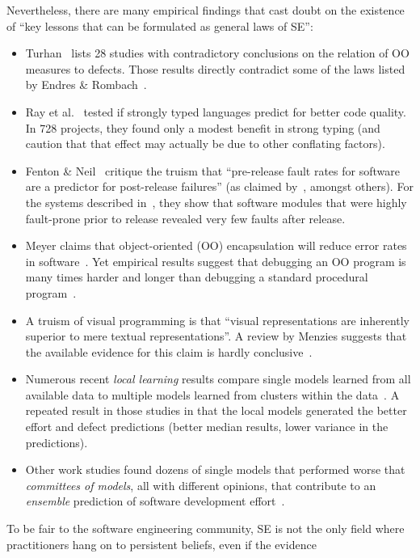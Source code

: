 \documentclass{sig-alternate}
\newcommand{\bi}{\begin{itemize}[leftmargin=0.4cm]}
\newcommand{\ei}{\end{itemize}}
\begin{document}
Nevertheless, there are many empirical  findings that 
cast doubt on the existence of  ``key lessons  that can be formulated
as general laws of SE'':
\bi
\item
Turhan~\cite{me12d} lists 28 studies with contradictory conclusions
on the relation of OO measures to defects.  Those results
 directly  contradict some of the laws listed by 
Endres \& Rombach~\cite{endres03}.

\item
Ray et al.~\cite{ray2014lang} tested if   strongly typed languages
predict for better code quality. In  728 projects,
they found  only a modest benefit in strong typing
(and caution that that effect may actually be due to other  conflating factors).
\item
Fenton \& Neil~\cite{fenton00,fenton00b}   critique the truism that
``pre-release fault rates for software
are a predictor for post-release failures'' (as claimed by~\cite{dunsmore88},
amongst others). For the systems described in~\cite{fenton97}, they
show that software modules that were highly fault-prone
prior to release revealed very few faults after release.
\item
Meyer claims that   object-oriented (OO) encapsulation will
reduce error rates in software~\cite{Meyer1988}.  Yet empirical results suggest
that debugging an OO program is many times harder and
longer than debugging a standard procedural program~\cite{hatton98}.
\item
A truism of visual programming is that ``visual
representations are inherently superior to mere textual representations''.
A review by Menzies suggests that the available
evidence for this claim is hardly conclusive~\cite{me00v}. 
\item Numerous recent {\em local learning} results compare single models
learned from all available data to multiple models learned from clusters within the data~\cite{betten14,yang11,yang13,minku13,me12d,me11m,betta12,posnett11}.
A repeated result in those studies in that the local models generated the better effort
and defect predictions (better median results,
lower variance in the predictions).
 \item 
Other work studies  found dozens of single
models that performed worse that {\em committees of models}, all with different opinions,
that contribute to an {\em ensemble} prediction of software development effort~\cite{kocaguneli2012value,azhar13}.
\ei
To be fair to the software engineering community, SE is not the only
field where practitioners hang on to persistent beliefs, even if the evidence
\end{document}
